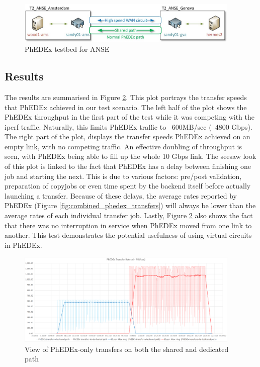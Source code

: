 \begin{figure}[h]
  \centering
  \includegraphics[width=0.95\textwidth]{Figures/FileDownload_ANSE_Testbed.jpg}
  \caption{PhEDEx testbed for ANSE}
  \label{fig:ANSE-setup}
\end{figure}

\subsection{Results}

The results are summarised in Figure \ref{fig:combined_transfers}. This plot portrays the transfer 
speeds that PhEDEx achieved in our test scenario. The left half of the plot shows the PhEDEx 
throughput in the first part of the test while it was competing with the iperf traffic. Naturally, 
this limits PhEDEx traffic to ~600MB/sec (~4800 Gbps). The right part of the plot, displays the 
transfer speeds PhEDEx achieved on an empty link, with no competing traffic. An effective doubling 
of throughput is seen, with PhEDEx being able to fill up the whole 10 Gbps link.
The seesaw look of this plot is linked to the fact that PhEDEx has a delay between finishing one job and 
starting the next. This is due to various factors: pre/post validation, preparation of copyjobs or 
even time spent by the backend itself before actually launching a transfer. Because of these delays, 
the average rates reported by PhEDEx (Figure \ref{fig:combined_phedex_transfers}) will always be lower 
than the average rates of each individual transfer job. 
Lastly, Figure \ref{fig:combined_transfers} also shows the fact that there was no interruption in service 
when PhEDEx moved from one link to another. This test demonstrates the potential usefulness of 
using virtual circuits in PhEDEx.

\begin{figure}[h]
  \centering
  \includegraphics[width=0.95\textwidth]{Figures/FileDownload_All_paths.png}
  \caption{View of PhEDEx-only transfers on both the shared and dedicated path}
  \label{fig:combined_transfers}
\end{figure} 

